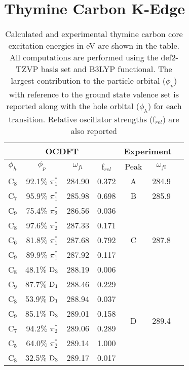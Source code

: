\documentclass[12pt]{article}
\begin{document}
\section{Thymine Carbon K-Edge}
      \begin{table}[!h]
      \footnotesize
 \centering
    \caption{Calculated and experimental thymine carbon core excitation energies in eV are shown in the table. All computations are performed using the def2-TZVP basis set and B3LYP functional. The largest contribution to the particle orbital ($\phi_p$) with reference to the ground state valence set is reported along with the hole orbital ($\phi_h$) for each transition. Relative oscillator strengths (f$_{rel}$) are also reported}
     \begin{tabular}{c@{\hskip 0.22in}c@{\hskip 0.22in}c@{\hskip 0.22in}c@{\hskip 0.52in}c@{\hskip 0.22in}c@{\hskip 0.22in}c}
     \hline
     \hline
   \multicolumn{4}{c}{OCDFT} &\multicolumn{2}{c}{Experiment} \\
   \hline
 $\phi_h$ &  $\phi_p$ & $\omega_{fi}$ & f$_{rel}$ & Peak &  $\omega_{fi}$   \\
   \hline
    C$_8$
 &   92.1$\%$ $\pi_1^*$  & 284.90 & 0.372 & A & 284.9  
 \vspace{0.1in} \\
    C$_7$
 &   95.9$\%$ $\pi_1^*$  & 285.98 & 0.698 & B & 285.9
 \vspace{0.1in} \\
    C$_9$
 &   75.4$\%$ $\pi_2^*$  & 286.56 & 0.036 & \multirow{5}{*}{C} & \multirow{5}{*}{287.8} \\
    C$_8$
 &   97.6$\%$ $\pi_2^*$  & 287.33 & 0.171 \\
    C$_6$
 &   81.8$\%$ $\pi_1^*$  & 287.68 & 0.792 \\
    C$_9$
 &   89.9$\%$ $\pi_1^*$  & 287.92 & 0.117 \\
    C$_8$
 &   48.1$\%$ $\rm D_3$  & 288.19 & 0.006 
 \vspace{0.1in} \\
    C$_9$
 &   87.7$\%$ $\rm D_1$  & 288.46 & 0.229 & \multirow{9}{*}{D} & \multirow{9}{*}{289.4} \\
    C$_8$
 &   53.9$\%$ $\rm D_1$  & 288.94 & 0.037 \\
    C$_9$
 &   85.1$\%$ $\rm D_3$  & 289.01 & 0.158 \\
    C$_7$
 &   94.2$\%$ $\pi_2^*$  & 289.06 & 0.289 \\
    C$_5$
 &   64.0$\%$ $\pi_2^*$  & 289.14 & 1.000 \\
    C$_8$
 &   32.5$\%$ $\rm D_3$  & 289.17 & 0.017 \\

\end{tabular}
\end{table}
\end{document}
